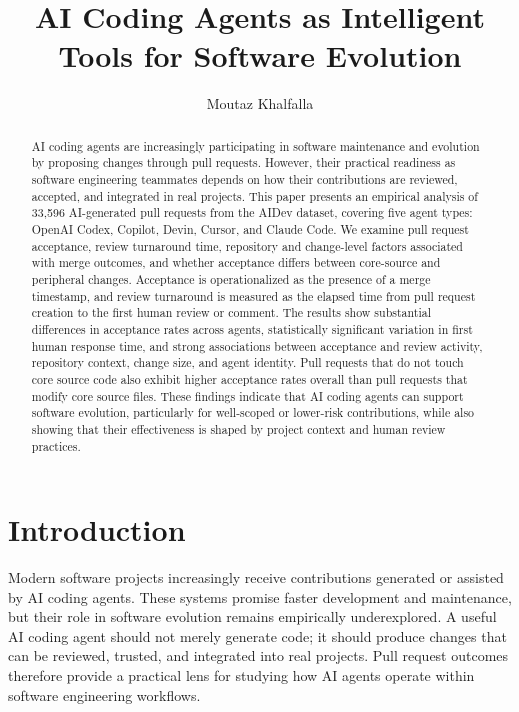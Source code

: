 \documentclass[sigconf,nonacm]{acmart}
\title{AI Coding Agents as Intelligent Tools for Software Evolution}
\author{Moutaz Khalfalla}
\affiliation{%
  \institution{Free University of Bozen-Bolzano}
  \city{Bolzano}
  \country{Italy}
}
\begin{document}
\begin{abstract}
AI coding agents are increasingly participating in software maintenance and evolution by proposing changes through pull requests. However, their practical readiness as software engineering teammates depends on how their contributions are reviewed, accepted, and integrated in real projects. This paper presents an empirical analysis of 33,596 AI-generated pull requests from the AIDev dataset, covering five agent types: OpenAI Codex, Copilot, Devin, Cursor, and Claude Code. We examine pull request acceptance, review turnaround time, repository and change-level factors associated with merge outcomes, and whether acceptance differs between core-source and peripheral changes. Acceptance is operationalized as the presence of a merge timestamp, and review turnaround is measured as the elapsed time from pull request creation to the first human review or comment. The results show substantial differences in acceptance rates across agents, statistically significant variation in first human response time, and strong associations between acceptance and review activity, repository context, change size, and agent identity. Pull requests that do not touch core source code also exhibit higher acceptance rates overall than pull requests that modify core source files. These findings indicate that AI coding agents can support software evolution, particularly for well-scoped or lower-risk contributions, while also showing that their effectiveness is shaped by project context and human review practices.
\end{abstract}


\maketitle

\section{Introduction}

Modern software projects increasingly receive contributions generated or assisted by AI coding agents. These systems promise faster development and maintenance, but their role in software evolution remains empirically underexplored. A useful AI coding agent should not merely generate code; it should produce changes that can be reviewed, trusted, and integrated into real projects. Pull request outcomes therefore provide a practical lens for studying how AI agents operate within software engineering workflows.
\end{document}
